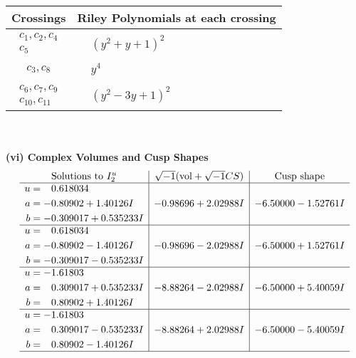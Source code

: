 \documentclass[1p]{elsarticle_modified}
\theoremstyle{definition}
\newcommand{\I}{\sqrt{-1}}
\begin{document}
\begin{tabular}{m{50pt}|m{274pt}}
Crossings & \hspace{64pt}Riley Polynomials at each crossing \\
\hline $$\begin{aligned}c_{1},c_{2},c_{4}\\c_{5}\end{aligned}$$&$\begin{aligned}
&(y^2+y+1)^2
\end{aligned}$\\
\hline $$\begin{aligned}c_{3},c_{8}\end{aligned}$$&$\begin{aligned}
&y^4
\end{aligned}$\\
\hline $$\begin{aligned}c_{6},c_{7},c_{9}\\c_{10},c_{11}\end{aligned}$$&$\begin{aligned}
&(y^2-3 y+1)^2
\end{aligned}$\\
\hline
\end{tabular}\\~\\
\newpage\flushleft \textbf{(vi) Complex Volumes and Cusp Shapes}
$$\begin{array}{c|c|c}  
\text{Solutions to }I^u_{2}& \I (\text{vol} + \sqrt{-1}CS) & \text{Cusp shape}\\
 \hline 
\begin{aligned}
u &= \phantom{-}0.618034\phantom{ +0.000000I} \\
a &= -0.80902 + 1.40126 I \\
b &= -0.309017 + 0.535233 I\end{aligned}
 & -0.98696 + 2.02988 I & -6.50000 - 1.52761 I \\ \hline\begin{aligned}
u &= \phantom{-}0.618034\phantom{ +0.000000I} \\
a &= -0.80902 - 1.40126 I \\
b &= -0.309017 - 0.535233 I\end{aligned}
 & -0.98696 - 2.02988 I & -6.50000 + 1.52761 I \\ \hline\begin{aligned}
u &= -1.61803\phantom{ +0.000000I} \\
a &= \phantom{-}0.309017 + 0.535233 I \\
b &= \phantom{-}0.80902 + 1.40126 I\end{aligned}
 & -8.88264 - 2.02988 I & -6.50000 + 5.40059 I \\ \hline\begin{aligned}
u &= -1.61803\phantom{ +0.000000I} \\
a &= \phantom{-}0.309017 - 0.535233 I \\
b &= \phantom{-}0.80902 - 1.40126 I\end{aligned}
 & -8.88264 + 2.02988 I & -6.50000 - 5.40059 I\\
 \hline 
 \end{array}$$\newpage
\end{document}
